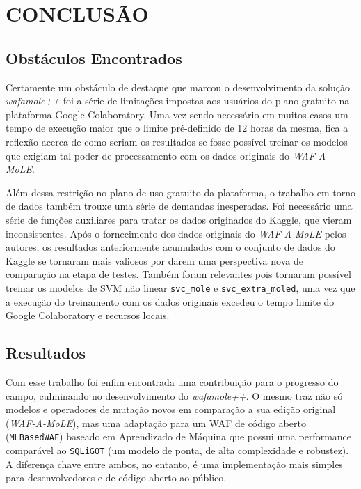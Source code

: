 \chapter{CONCLUSÃO}
\label{chp:capitulo6}

\section{Obstáculos Encontrados}

Certamente um obstáculo de destaque que marcou o desenvolvimento da solução \textit{wafamole++} foi a série de limitações impostas aos usuários do plano gratuito na plataforma Google Colaboratory. Uma vez sendo necessário em muitos casos um tempo de execução maior que o limite pré-definido de 12 horas da mesma, fica a reflexão acerca de como seriam os resultados se fosse possível treinar os modelos que exigiam tal poder de processamento com os dados originais do \textit{WAF-A-MoLE}.

Além dessa restrição no plano de uso gratuito da plataforma, o trabalho em torno de dados também trouxe uma série de demandas inesperadas. Foi necessário uma série de funções auxiliares para tratar os dados originados do Kaggle, que vieram inconsistentes. Após o fornecimento dos dados originais do \textit{WAF-A-MoLE} pelos autores, os resultados anteriormente acumulados com o conjunto de dados do Kaggle se tornaram mais valiosos por darem uma perspectiva nova de comparação na etapa de testes. Também foram relevantes pois tornaram possível treinar os modelos de SVM não linear \verb+svc_mole+ e \verb+svc_extra_moled+, uma vez que a execução do treinamento com os dados originais excedeu o tempo limite do Google Colaboratory e recursos locais.

\section{Resultados}

Com esse trabalho foi enfim encontrada uma contribuição para o progresso do campo, culminando no desenvolvimento do \textit{wafamole++}. O mesmo traz não só modelos e operadores de mutação novos em comparação a sua edição original (\textit{WAF-A-MoLE}), mas uma adaptação para um WAF de código aberto (\verb+MLBasedWAF+) baseado em Aprendizado de Máquina que possui uma performance comparável ao \verb+SQLiGOT+ (um modelo de ponta, de alta complexidade e robustez). A diferença chave entre ambos, no entanto, é uma implementação mais simples para desenvolvedores e de código aberto ao público.

